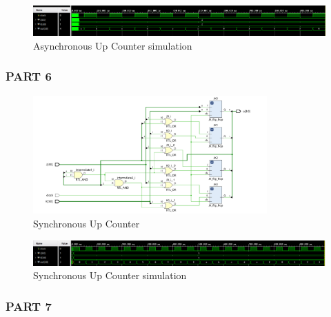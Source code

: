 \documentclass[pdftex,12pt,a4paper]{article}
\begin{document}
    \begin{figure}[H]
    	\centering
    	\includegraphics[width=1\textwidth]{simulations/async_sim.png}	
    	\caption{Asynchronous Up Counter simulation}
    	\label{Asynchronous Up Counter}
    \end{figure}




\subsubsection{PART 6}


\begin{figure}[H]
    	\centering
    	\includegraphics[width=0.8\textwidth]{schematic/sync.png}	
    	\caption{Synchronous Up Counter}
    	\label{Synchronous Up Counter}
    \end{figure}
    
    \begin{figure}[H]
    	\centering
    	\includegraphics[width=1\textwidth]{simulations/sync_sim.png}	
    	\caption{Synchronous Up Counter simulation}
    	\label{Synchronous Up Counter}
    \end{figure}




\subsubsection{PART 7}
\end{document}
